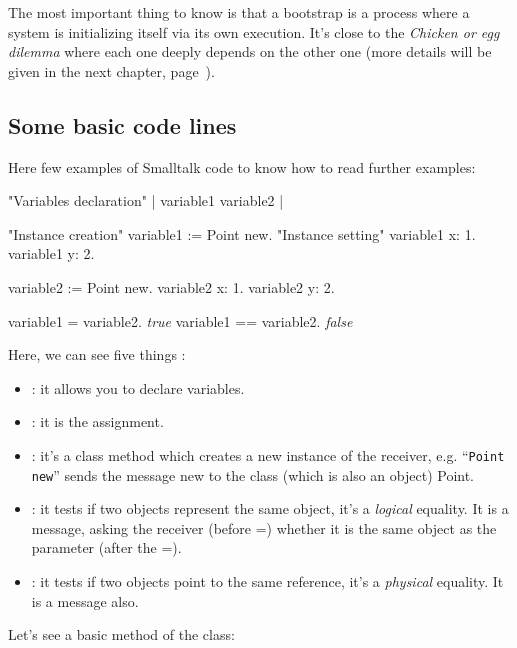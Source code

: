 The most important thing to know is that a bootstrap is a process where a system is initializing itself via its own execution. It's close to the \emph{Chicken or egg dilemma} where each one deeply depends on the other one (more details will be given in the next chapter, page~\pageref{BootStrap}).

\subsection{Some basic code lines}

Here few examples of \gls{Smalltalk} code to know how to read further examples:

\begin{code}{}
	"Variables declaration"
	| variable1 variable2 |

	"Instance creation"
	variable1 := Point new.
	"Instance setting"
	variable1 x: 1.
	variable1 y: 2.
	
	variable2 := Point new.
	variable2 x: 1.
	variable2 y: 2.
	
	variable1 = variable2. \emph{true}
	variable1 == variable2. \emph{false}
\end{code}
Here, we can see five things :
\begin{itemize}
	\item \ct{| |} : it allows you to declare variables.
	\item \ct{:=} : it is the assignment.
	\item {} : it's a class method which creates a new instance of the receiver, e.g. ``\texttt{Point new}'' sends the message new to the class (which is also an object) Point.
	\item \ct{=} : it tests if two objects represent the same object, it's a \emph{logical} equality. It is a message, asking the receiver (before =) whether it is the same object as the parameter (after the =).
	\item \ct{==} : it tests if two objects point to the same reference, it's a \emph{physical} equality. It is a message also.
\end{itemize}
Let's see a basic method of the  class:

